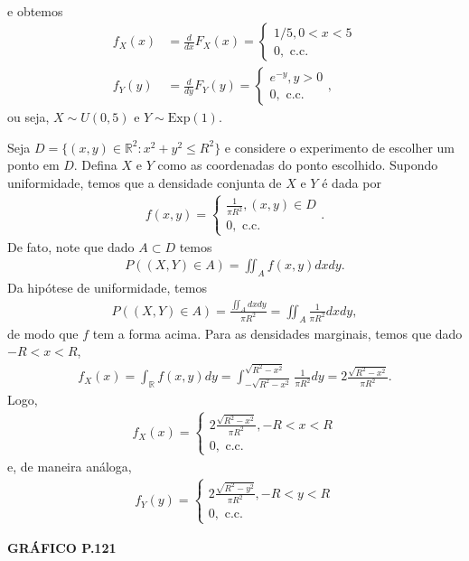 \documentclass[../Notas.tex]{subfiles}
\begin{document}
\begin{example}
\begin{align*}
\end{align*}
e obtemos
\begin{align*}
    f_X(x) &= \frac{d}{dx}F_X(x) = \begin{cases}
    1/5, 0 < x < 5 \\
    0, \text{ c.c.}
    \end{cases} \\
    f_Y(y) &= \frac{d}{dy}F_Y(y) = \begin{cases}
    e^{-y}, y > 0 \\
    0, \text{ c.c.}
    \end{cases},
\end{align*}
ou seja, $X\sim U(0,5)$ e $Y\sim\text{Exp}(1)$.
\end{example}

\begin{example}
Seja $D = \{ (x,y)\in\mathbb{R}^2 : x^2+y^2\leq R^2 \}$ e considere o experimento de escolher um ponto em $D$. Defina $X$ e $Y$ como as coordenadas do ponto escolhido. Supondo uniformidade, temos que a densidade conjunta de $X$ e $Y$ é dada por
\begin{align*}
    f(x,y) = \begin{cases}
    \frac{1}{\pi R^2}, (x,y)\in D \\
    0, \text{ c.c.}
    \end{cases}.
\end{align*}
De fato, note que dado $A\subset D$ temos
\begin{align*}
    P((X,Y)\in A) = \iint_A f(x,y) dxdy.
\end{align*}
Da hipótese de uniformidade, temos
\begin{align*}
    P((X,Y)\in A) = \frac{ \iint_A dxdy }{ \pi R^2 } = \iint_A \frac{1}{\pi R^2} dxdy,
\end{align*}
de modo que $f$ tem a forma acima. Para as densidades marginais, temos que dado $-R < x < R$,
\begin{align*}
    f_X(x) = \int_{\mathbb{R}} f(x,y)dy = \int_{-\sqrt{R^2-x^2}}^{\sqrt{R^2-x^2}} \frac{1}{\pi R^2} dy = 2\frac{\sqrt{R^2 - x^2}}{\pi R^2}.
\end{align*}
Logo,
\begin{align*}
    f_X(x) = \begin{cases}
    2\frac{\sqrt{R^2 - x^2}}{\pi R^2}, -R < x < R \\
    0, \text{ c.c.}
    \end{cases}
\end{align*}
e, de maneira análoga,
\begin{align*}
    f_Y(y) = \begin{cases}
    2\frac{\sqrt{R^2 - y^2}}{\pi R^2}, -R < y < R \\
    0, \text{ c.c.}
    \end{cases}
\end{align*}
\begin{center}
    \textbf{GRÁFICO P.121}
\end{center}
\end{example}
\end{document}

